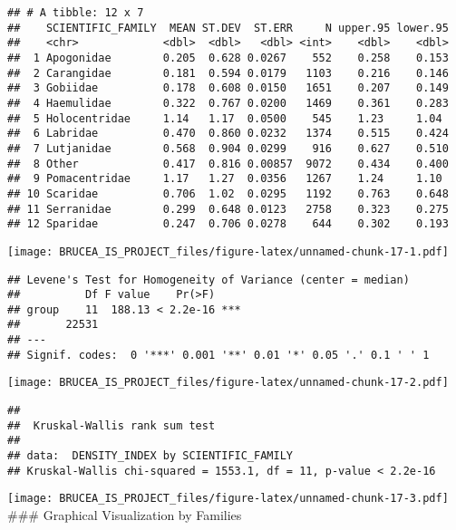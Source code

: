 \documentclass[
]{article}
\begin{document}
\begin{verbatim}
## # A tibble: 12 x 7
##    SCIENTIFIC_FAMILY  MEAN ST.DEV  ST.ERR     N upper.95 lower.95
##    <chr>             <dbl>  <dbl>   <dbl> <int>    <dbl>    <dbl>
##  1 Apogonidae        0.205  0.628 0.0267    552    0.258    0.153
##  2 Carangidae        0.181  0.594 0.0179   1103    0.216    0.146
##  3 Gobiidae          0.178  0.608 0.0150   1651    0.207    0.149
##  4 Haemulidae        0.322  0.767 0.0200   1469    0.361    0.283
##  5 Holocentridae     1.14   1.17  0.0500    545    1.23     1.04 
##  6 Labridae          0.470  0.860 0.0232   1374    0.515    0.424
##  7 Lutjanidae        0.568  0.904 0.0299    916    0.627    0.510
##  8 Other             0.417  0.816 0.00857  9072    0.434    0.400
##  9 Pomacentridae     1.17   1.27  0.0356   1267    1.24     1.10 
## 10 Scaridae          0.706  1.02  0.0295   1192    0.763    0.648
## 11 Serranidae        0.299  0.648 0.0123   2758    0.323    0.275
## 12 Sparidae          0.247  0.706 0.0278    644    0.302    0.193
\end{verbatim}

\texttt{[image: BRUCEA\_IS\_PROJECT\_files/figure-latex/unnamed-chunk-17-1.pdf]}

\begin{verbatim}
## Levene's Test for Homogeneity of Variance (center = median)
##          Df F value    Pr(>F)    
## group    11  188.13 < 2.2e-16 ***
##       22531                      
## ---
## Signif. codes:  0 '***' 0.001 '**' 0.01 '*' 0.05 '.' 0.1 ' ' 1
\end{verbatim}

\texttt{[image: BRUCEA\_IS\_PROJECT\_files/figure-latex/unnamed-chunk-17-2.pdf]}

\begin{verbatim}
## 
##  Kruskal-Wallis rank sum test
## 
## data:  DENSITY_INDEX by SCIENTIFIC_FAMILY
## Kruskal-Wallis chi-squared = 1553.1, df = 11, p-value < 2.2e-16
\end{verbatim}

\texttt{[image: BRUCEA\_IS\_PROJECT\_files/figure-latex/unnamed-chunk-17-3.pdf]}
\#\#\# Graphical Visualization by Families
\end{document}
